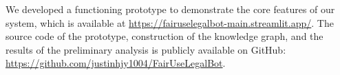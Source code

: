 We developed a functioning prototype to demonstrate the core features of our system, which is available at \href{https://fairuselegalbot-main.streamlit.app/}{https://fairuselegalbot-main.streamlit.app/}. The source code of the prototype, construction of the knowledge graph, and the results of the preliminary analysis is publicly available on GitHub: \href{https://github.com/justinhjy1004/FairUseLegalBot}{https://github.com/justinhjy1004/FairUseLegalBot}.